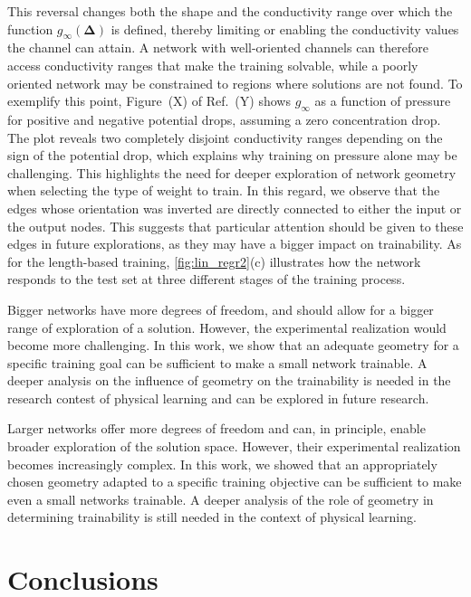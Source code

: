 \documentclass[reprint,superscriptaddress,prb,showkeys]{revtex4-2}
\begin{document}
This reversal changes both the shape and the conductivity range over which the function $g_{\infty}(\boldsymbol{\Delta})$ is defined, thereby limiting or enabling the conductivity values the channel can attain. A network with well-oriented channels can therefore access conductivity ranges that make the training solvable, while a poorly oriented network may be constrained to regions where solutions are not found. To exemplify this point, Figure~(X) of Ref.~(Y) shows $g_{\infty}$ as a function of pressure for positive and negative potential drops, assuming a zero concentration drop. The plot reveals two completely disjoint conductivity ranges depending on the sign of the potential drop, which explains why training on pressure alone may be challenging. This highlights the need for deeper exploration of network geometry when selecting the type of weight to train. In this regard, we observe that the edges whose orientation was inverted are directly connected to either the input or the output nodes. This suggests that particular attention should be given to these edges in future explorations, as they may have a bigger impact on trainability.
As for the length-based training, \cref{fig:lin_regr2}(c) illustrates how the network responds to the test set at three different stages of the training process.

Bigger networks have more degrees of freedom, and should allow for a bigger range of exploration of a solution. However, the experimental realization would become more challenging. In this work, we show that an adequate geometry for a specific training goal can be sufficient to make a small network trainable. A deeper analysis on the influence of geometry on the trainability is needed in the research contest of physical learning and can be explored in future research.

Larger networks offer more degrees of freedom and can, in principle, enable broader exploration of the solution space. However, their experimental realization becomes increasingly complex. In this work, we showed that an appropriately chosen geometry adapted to a specific training objective can be sufficient to make even a small networks trainable. A deeper analysis of the role of geometry in determining trainability is still needed in the context of physical learning.

\section{\label{sec:concl}Conclusions}
\end{document}
